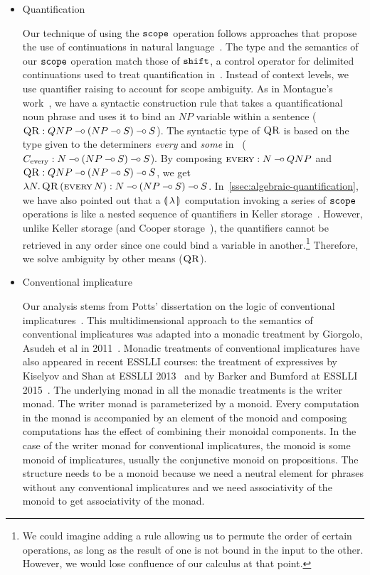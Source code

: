 \begin{itemize}
\item Quantification 

  Our technique of using the $\mathtt{scope}$ operation follows approaches that
  propose the use of continuations in natural
  language~\cite{de2001type,barker2002continuations}. The type and the
  semantics of our $\mathtt{scope}$ operation match those of $\mathtt{shift}$, a
  control operator for delimited continuations used to treat quantification
  in~\cite{shan2005linguistic}. Instead of context levels, we use
  quantifier raising to account for scope ambiguity. As in Montague's
  work~\cite{montague1973proper}, we have a syntactic construction rule
  that takes a quantificational noun phrase and uses it to bind an $NP$
  variable within a sentence ($\textsc{QR} : QNP \mathbin{{-}\mkern-3.5mu{\circ}} (NP \mathbin{{-}\mkern-3.5mu{\circ}} S) \mathbin{{-}\mkern-3.5mu{\circ}}
  S$). The syntactic type of $\textsc{QR}$ is based on the type given to the
  determiners \emph{every} and \emph{some}
  in~\cite{pogodalla2007generalizing}
  ($C_{\text{every}} : N \mathbin{{-}\mkern-3.5mu{\circ}} (NP \mathbin{{-}\mkern-3.5mu{\circ}} S) \mathbin{{-}\mkern-3.5mu{\circ}} S$). By composing
  $\textsc{every} : N \mathbin{{-}\mkern-3.5mu{\circ}} QNP$ and
  $\textsc{QR} : QNP \mathbin{{-}\mkern-3.5mu{\circ}} (NP \mathbin{{-}\mkern-3.5mu{\circ}} S) \mathbin{{-}\mkern-3.5mu{\circ}} S$, we get
  $\lambda N.\, \textsc{QR}\,(\textsc{every}\,N) : N \mathbin{{-}\mkern-3.5mu{\circ}} (NP \mathbin{{-}\mkern-3.5mu{\circ}} S)
  \mathbin{{-}\mkern-3.5mu{\circ}} S$. In~\ref{ssec:algebraic-quantification}, we have also pointed
  out that a ${\llparenthesis \, \lambda \, \rrparenthesis}$ computation invoking a series of $\mathtt{scope}$
  operations is like a nested sequence of quantifiers in Keller
  storage~\cite{keller1988nested}. However, unlike Keller storage (and
  Cooper storage~\cite{cooper1979montague}), the quantifiers cannot be
  retrieved in any order since one could bind a variable in
  another.\footnote{We could imagine adding a rule allowing us to permute
    the order of certain operations, as long as the result of one is not
    bound in the input to the other. However, we would lose confluence of
    our calculus at that point.} Therefore, we solve ambiguity by other
  means ($\textsc{QR}$).


\item Conventional implicature

  Our analysis stems from Potts' dissertation on the logic of conventional
  implicatures~\cite{potts2005logic}. This multidimensional approach to the
  semantics of conventional implicatures was adapted into a monadic
  treatment by Giorgolo, Asudeh et al in
  2011~\cite{giorgolo2011multidimensional,giorgolo2012monads}. Monadic
  treatments of conventional implicatures have also appeared in recent
  ESSLLI courses: the treatment of expressives by Kiselyov and Shan at
  ESSLLI 2013~\cite{kiselyov2010lambda} and by Barker and Bumford at ESSLLI
  2015~\cite{barker2015monads}. The underlying monad in all the monadic
  treatments is the writer monad. The writer monad is parameterized by a
  monoid. Every computation in the monad is accompanied by an element of
  the monoid and composing computations has the effect of combining their
  monoidal components. In the case of the writer monad for conventional
  implicatures, the monoid is some monoid of implicatures, usually the
  conjunctive monoid on propositions. The structure needs to be a monoid
  because we need a neutral element for phrases without any conventional
  implicatures and we need associativity of the monoid to get associativity
  of the monad.


\end{itemize}
